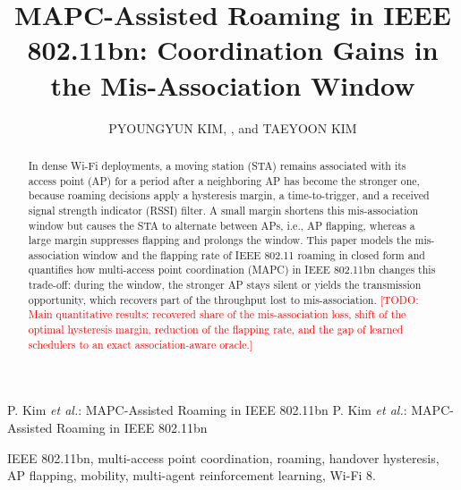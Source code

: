 \documentclass{ieeeaccess}
\newcommand{\todo}[1]{\textcolor{red}{[TODO: #1]}}
\begin{document}

\title{MAPC-Assisted Roaming in IEEE 802.11bn: Coordination Gains in the Mis-Association Window}
\author{\uppercase{Pyoungyun Kim}, , and \uppercase{Taeyoon Kim}}
\address[1]{Korea University, 145 Anam-ro, Seongbuk-gu, Seoul 02841, Republic of Korea}
\address[2]{Visual Display Division, Samsung Electronics, Republic of Korea}
\address[3]{School of Mobile System Engineering, Dankook University, Yongin 16890, Republic of Korea}

\markboth
{P. Kim \emph{et al.}: MAPC-Assisted Roaming in IEEE 802.11bn}
{P. Kim \emph{et al.}: MAPC-Assisted Roaming in IEEE 802.11bn}


\begin{abstract}
In dense Wi-Fi deployments, a moving station (STA) remains associated with its access point (AP) for a period after a neighboring AP has become the stronger one, because roaming decisions apply a hysteresis margin, a time-to-trigger, and a received signal strength indicator (RSSI) filter. A small margin shortens this mis-association window but causes the STA to alternate between APs, i.e., AP flapping, whereas a large margin suppresses flapping and prolongs the window. This paper models the mis-association window and the flapping rate of IEEE 802.11 roaming in closed form and quantifies how multi-access point coordination (MAPC) in IEEE 802.11bn changes this trade-off: during the window, the stronger AP stays silent or yields the transmission opportunity, which recovers part of the throughput lost to mis-association. \todo{Main quantitative results: recovered share of the mis-association loss, shift of the optimal hysteresis margin, reduction of the flapping rate, and the gap of learned schedulers to an exact association-aware oracle.}
\end{abstract}

\begin{keywords}
IEEE 802.11bn, multi-access point coordination, roaming, handover hysteresis, AP flapping, mobility, multi-agent reinforcement learning, Wi-Fi 8.
\end{keywords}

\titlepgskip=-21pt
\end{document}
